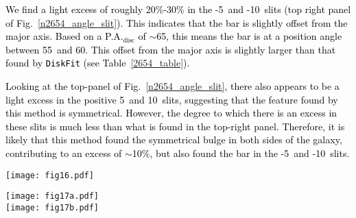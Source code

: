 \documentclass[a4paper,fleqn,usenatbib]{mnras}
\newcommand{\authorfix}{\textcolor{black}}
\begin{document}
\authorfix{We find a light excess of roughly 20\%-30\% in the -5\degr\ and -10\degr\ slits (top right panel of Fig.~\ref{n2654_angle_slit}). This indicates that the bar is slightly offset from the major axis. Based on a P.A.$_{\mathrm{disc}}$ of $\sim$65\degr, this means the bar is at a position angle between 55\degr\ and 60\degr. This offset from the major axis is slightly larger than that found by \texttt{DiskFit} (see Table~\ref{2654_table}).}

\authorfix{Looking at the top-panel of Fig.~\ref{n2654_angle_slit}, there also appears to be a light excess in the positive 5\degr\ and 10\degr\ slits, suggesting that the feature found by this method is symmetrical. However, the degree to which there is an excess in these slits is much less than what is found in the top-right panel. Therefore, it is likely that this method found the symmetrical bulge in both sides of the galaxy, contributing to an excess of $\sim$10\%, but also found the bar in the -5\degr\ and -10\degr\ slits.}

\begin{figure*}
	\centering
	\texttt{[image: fig16.pdf]}\\
	\caption{Contours of the centre of NGC 2654 in each of the four bands. The contour levels are at similar relative levels for each band. From these plots, the bulge of NGC 2654 is slightly peanut-shaped, most clearly seen as the pinch in the isophotes as they cross the minor axis. There is significant dust along the northern side of the galaxy.}
	\label{n2654_contour}
\end{figure*}

\begin{figure*}
	\centering
	\texttt{[image: fig17a.pdf]} \\
	\texttt{[image: fig17b.pdf]}
	\caption{Angled slit photometry for NGC 2654. The top panels show the normalized intensity profiles along slits at angles to the major axis. Each slit is normalized to the value of the major axis in order to show any enhancements present in the various slits. The plots below the intensity profiles show the percent difference between the slit and major axis (i.e. $\frac{slit - major}{major}$). The extra light present in the -5\degr\ and -10\degr\ slits from 10$\arcsec$ to 25$\arcsec$ indicate that the bar is angled away from the disc major axis. The bottom panel shows the on-sky projection of the slits, coloured and labeled to match the top panel (major axis has been coloured white for easier viewing). Arrows show north and east. East arrow is one arcminute in length.}
	\label{n2654_angle_slit}
\end{figure*}
\end{document}
